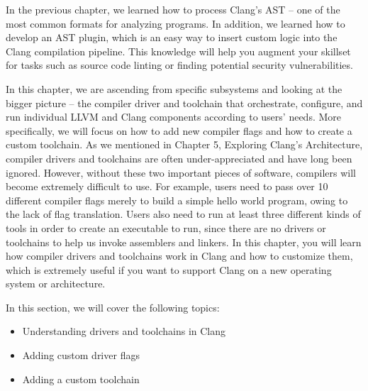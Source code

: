 In the previous chapter, we learned how to process Clang's AST – one of the most common formats for analyzing programs. In addition, we learned how to develop an AST plugin, which is an easy way to insert custom logic into the Clang compilation pipeline. This knowledge will help you augment your skillset for tasks such as source code linting or finding potential security vulnerabilities.

In this chapter, we are ascending from specific subsystems and looking at the bigger picture – the compiler driver and toolchain that orchestrate, configure, and run individual LLVM and Clang components according to users' needs. More specifically, we will focus on how to add new compiler flags and how to create a custom toolchain. As we mentioned in Chapter 5, Exploring Clang's Architecture, compiler drivers and toolchains are often under-appreciated and have long been ignored. However, without these two important pieces of software, compilers will become extremely difficult to use. For example, users need to pass over 10 different compiler flags merely to build a simple hello world program, owing to the lack of flag translation. Users also need to run at least three different kinds of tools in order to create an executable to run, since there are no drivers or toolchains to help us invoke assemblers and linkers. In this chapter, you will learn how compiler drivers and toolchains work in Clang and how to customize them, which is extremely useful if you want to support Clang on a new operating system or architecture.

In this section, we will cover the following topics:

\begin{itemize}
\item Understanding drivers and toolchains in Clang
\item Adding custom driver flags
\item Adding a custom toolchain
\end{itemize}











